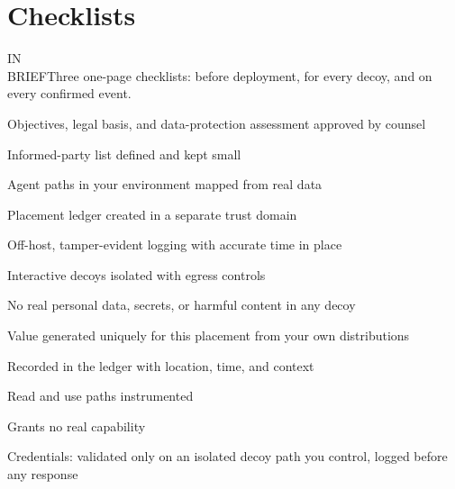 \documentclass[11pt,letterpaper]{article}
\newcommand{\inbrief}[1]{\begin{inbriefbox}IN\\BRIEF\tcblower #1\end{inbriefbox}}
\begin{document}
\section{Checklists}
\label{sec:checklists}

\inbrief{Three one-page checklists: before deployment, for every decoy, and on every confirmed event.}

\begin{tcbraster}[raster columns=3, raster equal height, raster column skip=8pt, raster valign=top]
\begin{tcolorbox}[checkcard, title={\ding{110}\hspace{0.4em}Before deployment}]
\begin{checklist}
  \item Objectives, legal basis, and data-protection assessment approved by counsel
  \item Informed-party list defined and kept small
  \item Agent paths in your environment mapped from real data
  \item Placement ledger created in a separate trust domain
  \item Off-host, tamper-evident logging with accurate time in place
  \item Interactive decoys isolated with egress controls
  \item No real personal data, secrets, or harmful content in any decoy
\end{checklist}
\end{tcolorbox}
\begin{tcolorbox}[checkcard, colframe=darkamber, colbacktitle=darkamber, title={\ding{110}\hspace{0.4em}Per decoy}]
\begin{checklist}
  \item Value generated uniquely for this placement from your own distributions
  \item Recorded in the ledger with location, time, and context
  \item Read and use paths instrumented
  \item Grants no real capability
  \item Credentials: validated only on an isolated decoy path you control, logged before any response

\end{checklist}
\end{tcolorbox}
\end{tcbraster}
\end{document}
